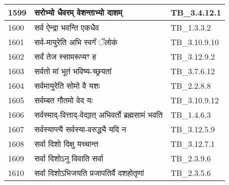 \documentclass[17pt]{extarticle}
\begin{document}
\begin{longtable}{||p{0.4in}||p{4.9in}||p{0.9in}||}
    \hline
        
    1599 & सरोभ्यो धैवरम् वेशन्ताभ्यो दाशम् & TB\_3.4.12.1       \\
    
    \hline
        
    1600 & सर्व ऐन्द्रा भवन्ति एकधैव & TB\_1.3.3.2       \\
    
    \hline
        
    1601 & सर्व{-}मायुरेति अभि स्वर्गं ॅलोकं & TB\_3.10.9.10       \\
    
    \hline
        
    1602 & सर्वं तेज स्सामरूप्यꣳ ह & TB\_3.12.9.2       \\
    
    \hline
        
    1603 & सर्वतो मां भूतं भविष्य{-}च्छ्रयतां & TB\_3.7.6.12       \\
    
    \hline
        
    1604 & सर्वमायुरेति सोमो वै यशः & TB\_2.2.8.8       \\
    
    \hline
        
    1605 & सर्वम्बत गौतमो वेद यः & TB\_3.10.9.12       \\
    
    \hline
        
    1606 & सर्वस्माद्{-}वित्ताद्{-}वेद्यात् अभिवर्तो ब्रह्मसामं भवति & TB\_1.4.6.3       \\
    
    \hline
        
    1607 & सर्वस्याप्त्यै सर्वस्या{-}वरुद्ध्यै यदि न & TB\_3.12.5.9       \\
    
    \hline
        
    1608 & सर्वा दिशो दिक्षु यच्चान्त & TB\_3.12.7.1       \\
    
    \hline
        
    1609 & सर्वा दिशोऽनु विवाति सर्वा & TB\_2.3.9.6       \\
    
    \hline
        
    1610 & सर्वा दिशोऽभिजयति प्रजापतिर्वै दशहोतृणां & TB\_2.3.5.6       \\
    
    \hline
        

\end{longtable}
\end{document}
